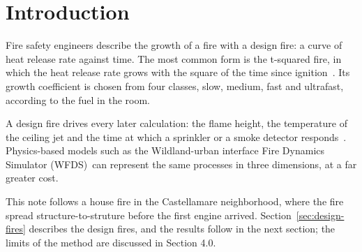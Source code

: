 \section{Introduction}
\label{sec:introduction}

Fire safety engineers describe the growth of a fire with a design fire: a curve of heat release rate against time.
The most common form is the t-squared fire, in which the heat release rate grows with the square of the time since
ignition~\cite{heskestad1982}. Its growth coefficient is chosen from four classes, slow, medium, fast and ultrafast,
according to the fuel in the room.

A design fire drives every later calculation: the flame height, the temperature of the ceiling jet and the time at
which a sprinkler or a smoke detector responds~\cite{alpert1972}. Physics-based models such as the Wildland-urban
interface Fire Dynamics Simulator (WFDS)~\cite{mell2009}can represent the same processes in three dimensions, at a
far greater cost.

This note follows a house fire in the Castellamare neighborhood, where the fire spread structure-to-struture before
the first engine arrived. Section~\ref{sec:design-fires} describes the design fires, and the results follow in the
next section; the limits of the method are discussed in Section 4.0.
